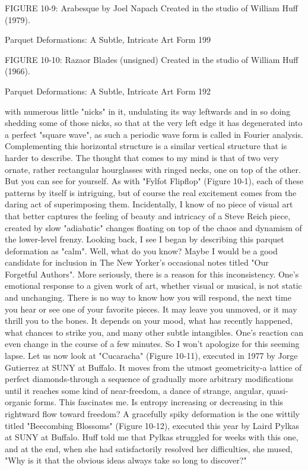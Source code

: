 FIGURE 10-9: Arabesque by Joel Napach Created in the studio of William Huff (1979).




Parquet Deformations: A Subtle, Intricate Art Form                               199

FIGURE 10-10: Razaor Blades (unsigned) Created in the studio of William Huff (1966).




Parquet Deformations: A Subtle, Intricate Art Form                               192

with numerous little "nicks" in it, undulating its way leftwards and in so doing shedding
some of those nicks, so that at the very left edge it has degenerated into a perfect "square
wave", as such a periodic wave form is called in Fourier analysis. Complementing this
horizontal structure is a similar vertical structure that is harder to describe. The thought
that comes to my mind is that of two very ornate, rather rectangular hourglasses with
ringed necks, one on top of the other. But you can see for yourself.
        As with "Fylfot Flipflop" (Figure 10-1), each of these patterns by itself is
intriguing, but of course the real excitement comes from the daring act of superimposing
them. Incidentally, I know of no piece of visual art that better captures the feeling of
beauty and intricacy of a Steve Reich piece, created by slow "adiabatic" changes floating
on top of the chaos and dynamism of the lower-level frenzy. Looking back, I see I began
by describing this parquet deformation as "calm". Well, what do you know? Maybe I
would be a good candidate for inclusion in The New Yorker's occasional notes titled
"Our Forgetful Authors".
        More seriously, there is a reason for this inconsistency. One's emotional response
to a given work of art, whether visual or musical, is not static and unchanging. There is
no way to know how you will respond, the next time you hear or see one of your favorite
pieces. It may leave you unmoved, or it may thrill you to the bones. It depends on your
mood, what has recently happened, what chances to strike you, and many other subtle
intangibles. One's reaction can even change in the course of a few minutes. So I won't
apologize for this seeming lapse.
        Let us now look at "Cucaracha" (Figure 10-11), executed in 1977 by Jorge
Gutierrez at SUNY at Buffalo. It moves from the utmost geometricity-a lattice of perfect
diamonds-through a sequence of gradually more arbitrary modifications until it reaches
some kind of near-freedom, a dance of strange, angular, quasi-organic forms. This
fascinates me. Is entropy increasing or decreasing in this rightward flow toward freedom?
        A gracefully spiky deformation is the one wittily titled "Beecombing Blossoms"
(Figure 10-12), executed this year by Laird Pylkas at SUNY at Buffalo. Huff told me that
Pylkas struggled for weeks with this one, and at the end, when she had satisfactorily
resolved her difficulties, she mused, "Why is it that the obvious ideas always take so long
to discover?"

